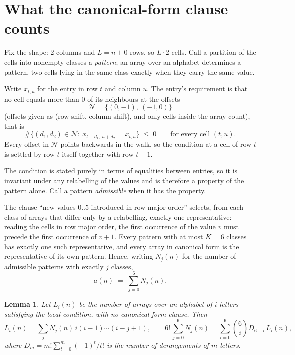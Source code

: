 \documentclass[11pt,a4paper]{article}
\theoremstyle{plain}
\newtheorem{lemma}[theorem]{Lemma}
\theoremstyle{definition}
\begin{document}
\section{What the canonical-form clause counts}

Fix the shape: $2$ columns and $L=n+0$ rows, so $L\cdot2$ cells. Call a
partition of the cells into nonempty classes a \emph{pattern}; an array over an alphabet
determines a pattern, two cells lying in the same class exactly when they carry the same
value.

Write $x_{t,u}$ for the entry in row $t$ and column $u$. The
entry's requirement is that no cell equals more than $0$ of its neighbours at the
offsets
\[
\mathcal N=\{(0,-1),\ (-1,0)\}
\]
(offsets given as (row shift, column shift), and only cells inside the array count),
that is
\begin{equation}\label{eq:loc}
\#\bigl\{(d_1,d_2)\in\mathcal N:\ x_{t+d_1,\,u+d_2}=x_{t,u}\bigr\}\;\le\;0
\qquad\text{for every cell }(t,u).
\end{equation}
Every offset in $\mathcal N$ points backwards in the walk, so the condition at a cell of
row $t$ is settled by row $t$ itself together with row $t-1$.

The condition is stated purely in terms of equalities between entries, so it is invariant
under any relabelling of the values and is therefore a property of the pattern alone. Call a
pattern \emph{admissible} when it has the property.

The clause ``new values $0..5$ introduced in row major order'' selects, from each class
of arrays that differ only by a relabelling, exactly one representative: reading the cells in
row major order, the first occurrence of the value $v$ must precede the first occurrence of
$v+1$. Every pattern with at most $K=6$ classes has exactly one such representative, and
every array in canonical form is the representative of its own pattern. Hence, writing
$N_j(n)$ for the number of admissible patterns with exactly $j$ classes,
\begin{equation}\label{eq:apat}
a(n)\;=\;\sum_{j=0}^{6}N_j(n).
\end{equation}

\begin{lemma}\label{lem:inv}
Let $L_i(n)$ be the number of arrays over an alphabet of $i$ letters satisfying the local
condition, with no canonical-form clause. Then
\[
L_i(n)=\sum_j N_j(n)\,i(i-1)\cdots(i-j+1),
\qquad
6!\,\sum_{j=0}^{6}N_j(n)=\sum_{i=0}^{6}\binom{6}{i}D_{6-i}\,L_i(n),
\]
where $D_m=m!\sum_{t=0}^{m}(-1)^t/t!$ is the number of derangements of $m$ letters.
\end{lemma}
\end{document}
